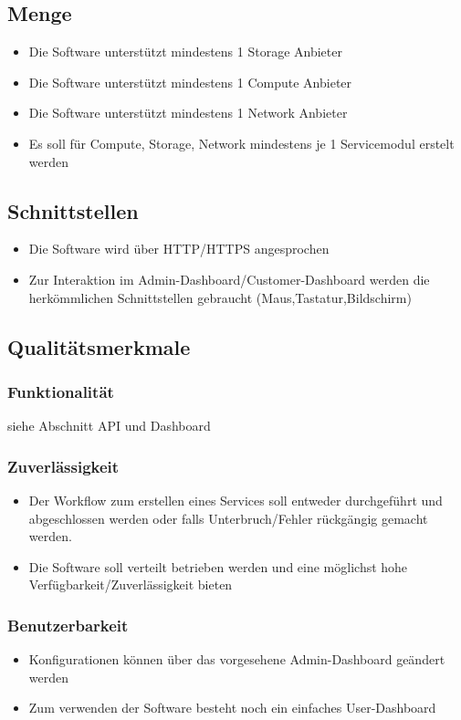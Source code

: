 \subsection{Menge}
\begin{itemize}
  \item Die Software unterstützt mindestens 1 Storage Anbieter
  \item Die Software unterstützt mindestens 1 Compute Anbieter
  \item Die Software unterstützt mindestens 1 Network Anbieter
  \item Es soll für Compute, Storage, Network mindestens je 1 Servicemodul erstelt 
  werden
\end{itemize}

\subsection{Schnittstellen}
\begin{itemize}
  \item Die Software wird über HTTP/HTTPS angesprochen
  \item Zur Interaktion im Admin-Dashboard/Customer-Dashboard werden die herkömmlichen 
  Schnittstellen gebraucht (Maus,Tastatur,Bildschirm)
\end{itemize}
\subsection{Qualitätsmerkmale}
\subsubsection{Funktionalität}
siehe Abschnitt API und Dashboard
\subsubsection{Zuverlässigkeit}
\begin{itemize}
  \item Der Workflow zum erstellen eines Services soll entweder durchgeführt und 
  abgeschlossen werden oder falls Unterbruch/Fehler rückgängig gemacht 
  werden.
  \item Die Software soll verteilt betrieben werden und eine möglichst hohe 
  Verfügbarkeit/Zuverlässigkeit bieten
\end{itemize}
\subsubsection{Benutzerbarkeit}
\begin{itemize}
  \item Konfigurationen können über das vorgesehene Admin-Dashboard geändert werden
  \item Zum verwenden der Software besteht noch ein einfaches 
  User-Dashboard
\end{itemize}
